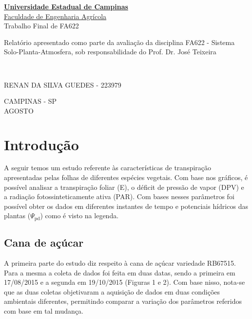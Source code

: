 \documentclass[a4paper, 12pt]{article}
\numberwithin{equation}{section}
\begin{document}
	\begin{titlepage}
		\begin{center}
			\textbf{\href{https://www.unicamp.br/unicamp/}{Universidade Estadual de Campinas}}\\\vspace{1cm}
			\href{https://www.feagri.unicamp.br/portal/}{Faculdade de Engenharia Agrícola}\\\vspace{5cm}
			\large{Trabalho Final de FA622}\\\vspace{4cm}
		\end{center}
		
		\hspace{8cm}\parbox{7cm}{Relatório apresentado como parte da avaliação da disciplina FA622 - Sistema Solo-Planta-Atmosfera, sob responsabilidade do Prof. Dr. José Teixeira}\\\vspace{4cm}
		
		RENAN DA SILVA GUEDES - 223979\\\vspace{4cm}
		\begin{center}
			CAMPINAS - SP\\\vspace{.2cm}
			AGOSTO
		\end{center}
		
	\end{titlepage}

	\newpage
	
	\tableofcontents
	\listoffigures
	
	\newpage
	
	\section{Introdução}

	A seguir temos um estudo referente às características de transpiração apresentadas pelas folhas de diferentes espécies vegetais. Com base nos gráficos, é possível analisar a transpiração foliar (E), o déficit de pressão de vapor (DPV) e a radiação fotossinteticamente ativa (PAR). Com bases nesses parâmetros foi possível obter os dados em diferentes instantes de tempo e potenciais hídricos das plantas ($\Psi_{\textrm{pd}}$) como é visto na legenda.

	\subsection{Cana de açúcar}	
	A primeira parte do estudo diz respeito à cana de açúcar variedade RB67515. Para a mesma a coleta de dados foi feita em duas datas, sendo a primeira em 17/08/2015 e a segunda em 19/10/2015 (Figuras 1 e 2). Com base nisso, nota-se que as duas coletas objetivaram a aquisição de dados em duas condições ambientais diferentes, permitindo comparar a variação dos parâmetros referidos com base em tal mudança.
	
\end{document}
